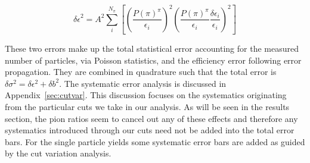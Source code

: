 \begin{equation}
{\delta \epsilon }^2 = A^2 \sum_i^{N_{\pi}} \left[ \left( \frac{P(\pi)^{\pi} }{\epsilon_i} \right)^2  \left(  \frac{P(\pi)^{\pi} }{\epsilon_i} \frac{\delta \epsilon_i}{\epsilon_i} \right)^2   \right]
\end{equation}

These two errors make up the total statistical error accounting for the measured number of particles, via Poisson statistics, and the efficiency error following error propagation. They are combined in quadrature such that the total error is $\delta \sigma^2 = \delta\epsilon^2 + \delta b^2$. The systematic error analysis is discussed in Appendix~\ref{sec:cutvar}. This discussion focuses on the systematics originating from the particular cuts we take in our analysis. As will be seen in the results section, the pion ratios seem to cancel out any of these effects and therefore any systematics introduced through our cuts need not be added into the total error bars. For the single particle yields some systematic error bars are added as guided by the cut variation analysis. 